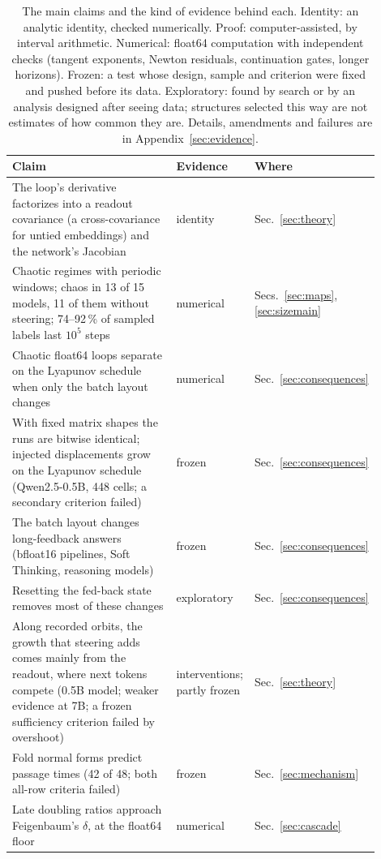\documentclass[11pt,letterpaper]{article}
\begin{document}
\begin{table}[tbp]
\centering
\caption{The main claims and the kind of evidence behind each. Identity: an analytic identity, checked numerically.
Proof: computer-assisted, by interval arithmetic. Numerical: float64 computation with independent checks (tangent
exponents, Newton residuals, continuation gates, longer horizons). Frozen: a test whose design, sample and criterion
were fixed and pushed before its data. Exploratory: found by search or by an analysis designed after seeing data;
structures selected this way are not estimates of how common they are. Details, amendments and failures are in
Appendix~\ref{sec:evidence}.}
\label{tab:claims}
\small
\begin{tabular}{p{0.56\linewidth}p{0.2\linewidth}p{0.14\linewidth}}
\toprule
Claim & Evidence & Where \\
\midrule
The loop's derivative factorizes into a readout covariance (a cross-covariance for untied embeddings) and the network's Jacobian & identity & Sec.~\ref{sec:theory} \\
Chaotic regimes with periodic windows; chaos in 13 of 15 models, 11 of them without steering; 74--92\,\% of sampled labels last $10^5$ steps & numerical & Secs.~\ref{sec:maps}, \ref{sec:sizemain} \\
Chaotic float64 loops separate on the Lyapunov schedule when only the batch layout changes & numerical & Sec.~\ref{sec:consequences} \\
With fixed matrix shapes the runs are bitwise identical; injected displacements grow on the Lyapunov schedule (Qwen2.5-0.5B, 448 cells; a secondary criterion failed) & frozen & Sec.~\ref{sec:consequences} \\
The batch layout changes long-feedback answers (bfloat16 pipelines, Soft Thinking, reasoning models) & frozen & Sec.~\ref{sec:consequences} \\
Resetting the fed-back state removes most of these changes & exploratory & Sec.~\ref{sec:consequences} \\
Along recorded orbits, the growth that steering adds comes mainly from the readout, where next tokens compete (0.5B model; weaker evidence at 7B; a frozen sufficiency criterion failed by overshoot) & interventions; partly frozen & Sec.~\ref{sec:theory} \\
Fold normal forms predict passage times (42 of 48; both all-row criteria failed) & frozen & Sec.~\ref{sec:mechanism} \\
Late doubling ratios approach Feigenbaum's $\delta$, at the float64 floor & numerical & Sec.~\ref{sec:cascade} \\

\end{tabular}
\end{table}
\end{document}
